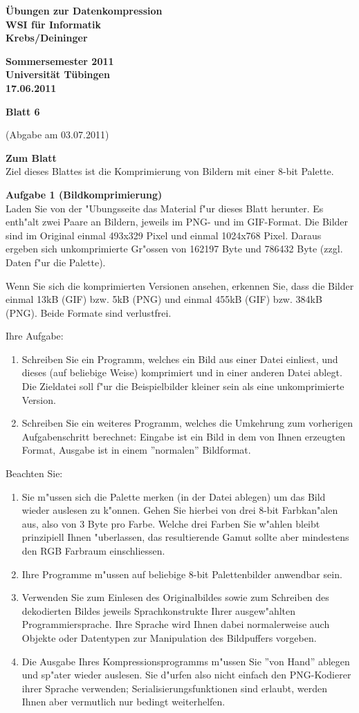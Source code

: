 \documentclass[a4paper]{article}
\def\header#1#2#3#4{\pagestyle{empty}
\noindent
\begin{minipage}[t]{0.6\textwidth}
\begin{flushleft}
\bf \"Ubungen zur Datenkompression\\
WSI f\"ur Informatik\\
Krebs/Deininger
\end{flushleft}
\end{minipage}
\begin{minipage}[t]{0.4\textwidth}
\begin{flushright}
\bf Sommersemester 2011\\
Universit\"at T\"ubingen\\
#2 %
\end{flushright}
\end{minipage}

\begin{center}
{\Large\bf Blatt #1}

{(Abgabe am #3)}
\end{center}
}
\begin{document}
\header{6}{17.06.2011}{03.07.2011}{}

\bigskip

{\bf Zum Blatt}\\
Ziel dieses Blattes ist die Komprimierung von Bildern mit einer 8-bit Palette.

\bigskip

{\bf Aufgabe 1  \quad(Bildkomprimierung)}\\
Laden Sie von der "Ubungsseite das Material f"ur dieses Blatt herunter. Es
enth"alt zwei Paare an Bildern, jeweils im PNG- und im GIF-Format. Die Bilder
sind im Original einmal 493x329 Pixel und einmal 1024x768 Pixel. Daraus ergeben
sich unkomprimierte Gr"ossen von 162197 Byte und 786432 Byte (zzgl. Daten f"ur
die Palette).

Wenn Sie sich die komprimierten Versionen ansehen, erkennen Sie, dass die Bilder
einmal 13kB (GIF) bzw. 5kB (PNG) und einmal 455kB (GIF) bzw. 384kB (PNG). Beide
Formate sind verlustfrei.

Ihre Aufgabe:
\begin{enumerate}
\item Schreiben Sie ein Programm, welches ein Bild aus einer Datei einliest, und
      dieses (auf beliebige Weise) komprimiert und in einer anderen Datei
      ablegt. Die Zieldatei soll f"ur die Beispielbilder kleiner sein als eine
      unkomprimierte Version.
\item Schreiben Sie ein weiteres Programm, welches die Umkehrung zum vorherigen
      Aufgabenschritt berechnet: Eingabe ist ein Bild in dem von Ihnen erzeugten
      Format, Ausgabe ist in einem ''normalen'' Bildformat.
\end{enumerate}

Beachten Sie:
\begin{enumerate}
\item Sie m"ussen sich die Palette merken (in der Datei ablegen) um das Bild
      wieder auslesen zu k"onnen. Gehen Sie hierbei von drei 8-bit Farbkan"alen
      aus, also von 3 Byte pro Farbe. Welche drei Farben Sie w"ahlen bleibt
      prinzipiell Ihnen "uberlassen, das resultierende Gamut sollte aber
      mindestens den RGB Farbraum einschliessen.
\item Ihre Programme m"ussen auf beliebige 8-bit Palettenbilder anwendbar sein.
\item Verwenden Sie zum Einlesen des Originalbildes sowie zum Schreiben des
      dekodierten Bildes jeweils Sprachkonstrukte Ihrer ausgew"ahlten
      Programmiersprache. Ihre Sprache wird Ihnen dabei normalerweise auch
      Objekte oder Datentypen zur Manipulation des Bildpuffers vorgeben.
\item Die Ausgabe Ihres Kompressionsprogramms m"ussen Sie ''von Hand'' ablegen
      und sp"ater wieder auslesen. Sie d"urfen also nicht einfach den
      PNG-Kodierer ihrer Sprache verwenden; Serialisierungsfunktionen sind
      erlaubt, werden Ihnen aber vermutlich nur bedingt weiterhelfen.
\end{enumerate}
\end{document}
